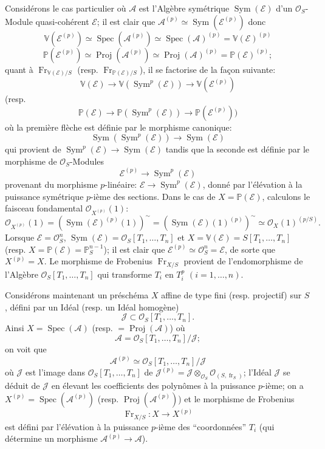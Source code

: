 \documentclass[11pt]{article}
\DeclareMathOperator{\Spec}{Spec}
\providecommand{\OO}{\mathcal{O}}
\providecommand{\cE}{\mathcal E}
\providecommand{\Spec}{\operatorname{Spec}}
\providecommand{\Sym}{\operatorname{Sym}}
\providecommand{\Spec}{\operatorname{Spec}}
\providecommand{\Spec}{\operatorname{Spec}}
\providecommand{\fr}{\operatorname{fr}}
\providecommand{\Fr}{\operatorname{Fr}}
\providecommand{\Proj}{\operatorname{Proj}}
\providecommand{\Sym}{\operatorname{Sym}}
\providecommand{\JJ}{\mathcal J}
\providecommand{\Fr}{\operatorname{Fr}}
\providecommand{\fr}{\operatorname{fr}}
\providecommand{\Spec}{\operatorname{Spec}}
\begin{document}
Considérons le cas particulier où $\mathcal{A}$ est l'Algèbre symétrique $\Sym(\cE)$ d'un $\OO_S$-Module quasi-cohérent $\cE$; il est clair que $\mathcal{A}^{(p)}\simeq\Sym(\cE^{(p)})$ donc
\[
\mathbb V(\cE^{(p)})\simeq\Spec(\mathcal{A}^{(p)})\simeq\Spec(\mathcal{A})^{(p)}=\mathbb V(\cE)^{(p)}
\]
\[
\mathbb P(\cE^{(p)})\simeq\Proj(\mathcal{A}^{(p)})\simeq\Proj(\mathcal{A})^{(p)}=\mathbb P(\cE)^{(p)};
\]
quant à $\Fr_{\mathbb V(\cE)/S}$ (resp. $\Fr_{\mathbb P(\cE)/S}$), il se factorise de la façon suivante:
\[
\mathbb V(\cE)\longrightarrow \mathbb V(\Sym^p(\cE))\longrightarrow \mathbb V(\cE^{(p)})
\]
(resp.
\[
\mathbb P(\cE)\longrightarrow \mathbb P(\Sym^p(\cE))\longrightarrow \mathbb P(\cE^{(p)}))
\]
où la
première flèche est définie par le morphisme canonique:
\[
\Sym(\Sym^p(\cE))\longrightarrow \Sym(\cE)
\]
qui provient de $\Sym^p(\cE)\to\Sym(\cE)$ tandis que la seconde est définie par le morphisme de $\OO_S$-Modules
\[
\cE^{(p)}\longrightarrow \Sym^p(\cE)
\]
provenant du morphisme $p$-linéaire: $\cE\to\Sym^p(\cE)$, donné par l'élévation à la puissance symétrique $p$-ième des sections. Dans le cas de $X=\mathbb P(\cE)$, calculons le faisceau fondamental $\OO_{X^{(p)}}(1)$:
\[
\OO_{X^{(p)}}(1)=(\Sym(\cE)^{(p)}(1))^{\sim}
=(\Sym(\cE)(1)^{(p)})^{\sim}
\simeq \OO_X(1)^{(p/S)}.
\]
Lorsque $\cE=\OO_S^n$, $\Sym(\cE)=\OO_S[T_1,\ldots,T_n]$ et $X=\mathbb V(\cE)=S[T_1,\ldots,T_n]$ (resp. $X=\mathbb P(\cE)=\mathbb P_S^{n-1}$); il est clair que $\cE^{(p)}\simeq\OO_S^n=\cE$, de sorte que $X^{(p)}=X$. Le morphisme de Frobenius $\Fr_{X/S}$ provient de l'endomorphisme de l'Algèbre $\OO_S[T_1,\ldots,T_n]$ qui transforme $T_i$ en $T_i^p$ $(i=1,\ldots,n)$.

Considérons maintenant un préschéma $X$ affine de type fini (resp. projectif) sur $S$, défini par un Idéal (resp. un Idéal homogène)
\[
\JJ\subset \OO_S[T_1,\ldots,T_n].
\]
Ainsi $X=\Spec(\mathcal{A})$ (resp. $=\Proj(\mathcal{A})$) où
\[
\mathcal{A}=\OO_S[T_1,\ldots,T_n]/\JJ;
\]
on voit que
\[
\mathcal{A}^{(p)}\simeq \OO_S[T_1,\ldots,T_n]/\mathscr{J}
\]
où $\mathscr{J}$ est l'image dans $\OO_S[T_1,\ldots,T_n]$ de $\JJ^{(p)}=\JJ\otimes_{\OO_S}\OO_{(S,\fr_S)}$; l'Idéal $\mathscr{J}$ se déduit de $\JJ$ en élevant les coefficients des polynômes à la puissance $p$-ième; on a $X^{(p)}=\Spec(\mathcal{A}^{(p)})$ (resp. $\Proj(\mathcal{A}^{(p)})$) et le
morphisme de Frobenius
\[
\Fr_{X/S}:X\longrightarrow X^{(p)}
\]
est défini par l'élévation à la puissance $p$-ième des ``coordonnées'' $T_i$ (qui détermine un morphisme $\mathcal{A}^{(p)}\to\mathcal{A}$).
\end{document}
